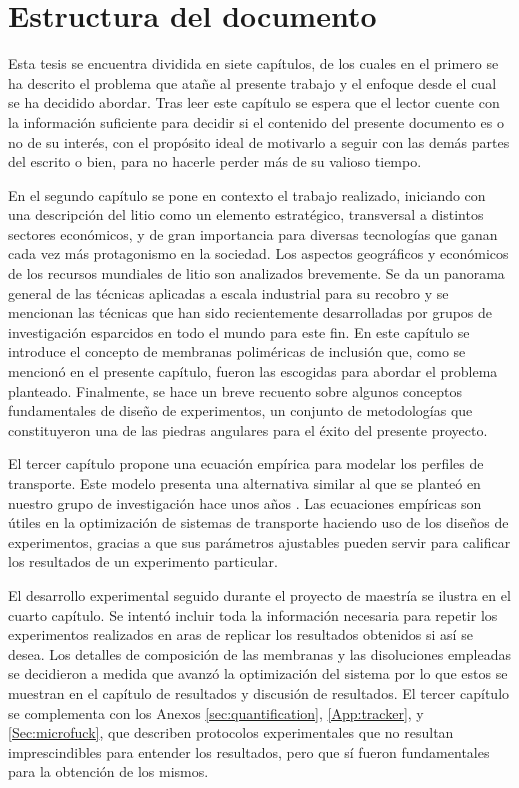 \section{Estructura del documento}
Esta tesis se encuentra dividida en siete capítulos, de los cuales en el primero se ha descrito el problema que atañe al presente trabajo y el enfoque desde el cual se ha decidido abordar. Tras leer este capítulo se espera que el lector cuente con la información suficiente para decidir si el contenido del presente documento es o no de su interés, con el propósito ideal de motivarlo a seguir con las demás partes del escrito o bien, para no hacerle perder más de su valioso tiempo.

En el segundo capítulo se pone en contexto el trabajo realizado, iniciando con una descripción del litio como un elemento estratégico, transversal a distintos sectores económicos, y de gran importancia para diversas tecnologías que ganan cada vez más protagonismo en la sociedad. Los aspectos geográficos y económicos de los recursos mundiales de litio son analizados brevemente. Se da un panorama general de las técnicas aplicadas a escala industrial para su recobro y se mencionan las técnicas que han sido recientemente desarrolladas por grupos de investigación esparcidos en todo el mundo para este fin. En este capítulo se introduce el concepto de membranas poliméricas de inclusión que, como se mencionó en el presente capítulo, fueron las escogidas para abordar el problema planteado. Finalmente, se hace un breve recuento sobre algunos conceptos fundamentales de diseño de experimentos, un conjunto de metodologías que constituyeron una de las piedras angulares para el éxito del presente proyecto. 

El tercer capítulo propone una ecuación empírica para modelar los perfiles de transporte. Este modelo presenta una alternativa similar al que se planteó en nuestro grupo de investigación hace unos años \citep{RODRIGUEZDESANMIGUEL2014}. Las ecuaciones empíricas son útiles en la optimización de sistemas de transporte haciendo uso de los diseños de experimentos, gracias a que sus parámetros ajustables pueden servir para calificar los resultados de un experimento particular.

El desarrollo experimental seguido durante el proyecto de maestría se ilustra en el cuarto capítulo. Se intentó incluir toda la información necesaria para repetir los experimentos realizados en aras de replicar los resultados obtenidos si así se desea. Los detalles de composición de las membranas y las disoluciones empleadas se decidieron a medida que avanzó la optimización del sistema por lo que estos se muestran en el capítulo de resultados y discusión de resultados. El tercer capítulo se complementa con los Anexos \ref{sec:quantification}, \ref{App:tracker}, y \ref{Sec:microfuck}, que describen protocolos experimentales que no resultan imprescindibles para entender los resultados, pero que sí fueron fundamentales para la obtención de los mismos.

